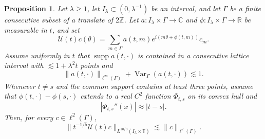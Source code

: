 \documentclass[11pt,a4paper]{amsart}
\newtheorem{proposition}[theorem]{Proposition}
\numberwithin{equation}{section}
\newcommand{\T}{\mathbb T}
\newcommand{\norm}[1]{\lVert #1\rVert}
\begin{document}
\begin{proposition}\label{prop:weighted-sum}
Let \(\lambda\ge1\), let \(I_\lambda\subset(0,\lambda^{-1})\) be an interval,
and let \(\Gamma\) be a finite consecutive subset of a translate of
\(2\mathbb Z\). Let
\(a:I_\lambda\times\Gamma\to\mathbb C\) and
\(\phi:I_\lambda\times\Gamma\to\mathbb R\) be measurable in \(t\), and set
\[
 \mathcal U(t)c(\theta)
 =\sum_{m\in\Gamma}a(t,m)e^{i(m\theta+\phi(t,m))}c_m.
\]
Assume uniformly in \(t\) that \(\operatorname{supp}a(t,\cdot)\) is contained
in a consecutive lattice interval with \(\lesssim1+\lambda^2t\) points and
\[
 \norm{a(t,\cdot)}_{\ell^\infty(\Gamma)}
 +\operatorname{Var}_\Gamma(a(t,\cdot))\lesssim1.
\]
Whenever \(t\ne s\) and the common support contains at least three points,
assume that \(\phi(t,\cdot)-\phi(s,\cdot)\) extends to a real \(C^2\) function
\(\Phi_{t,s}\) on its convex hull and
\[
 |\Phi_{t,s}''(x)|\approx|t-s|.
\]
Then, for every \(c\in\ell^2(\Gamma)\),
\begin{equation}\label{eq:weighted-sum-bound}
 \norm{t^{-1/5}\mathcal U(t)c}_{L^{10/3}(I_\lambda\times\T)}
 \lesssim\norm c_{\ell^2(\Gamma)}.
\end{equation}
\end{proposition}
\end{document}
